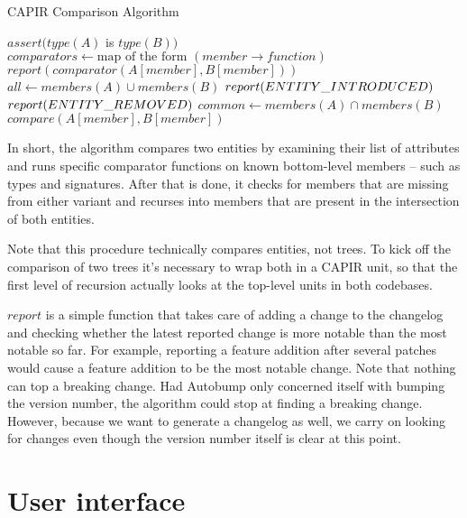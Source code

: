 \documentclass{l4proj}
\begin{document}
\begin{algorithm}
\caption{CAPIR Comparison Algorithm}
\begin{algorithmic}[1]
\State $assert(type(A)$ is $type(B))$
\State $comparators \gets \text{map of the form }(member \rightarrow function)$
$report(comparator(A[member], B[member]))$
\EndIf
\EndFor
\State $all \gets members(A) \cup members(B)$
$report(\detokenize{ENTITY_INTRODUCED})$
\EndIf
{}
$report(\detokenize{ENTITY_REMOVED})$
\EndIf
\EndFor
\State $common \gets members(A) \cap members(B)$
$compare(A[member], B[member])$
\EndFor
\EndProcedure
\end{algorithmic}
\end{algorithm}

In short, the algorithm compares two entities by examining their list
of attributes and runs specific comparator functions on known
bottom-level members -- such as types and signatures. After that is
done, it checks for members that are missing from either variant and
recurses into members that are present in the intersection of both entities.

Note that this procedure technically compares entities, not trees. To
kick off the comparison of two trees it's necessary to wrap both in a
CAPIR unit, so that the first level of recursion actually looks at the
top-level units in both codebases.

$report$ is a simple function that takes care of adding a change to
the changelog and checking whether the latest reported change is more
notable than the most notable so far. For example, reporting a feature
addition after several patches would cause a feature addition to be
the most notable change. Note that nothing can top a breaking change.
Had Autobump only concerned itself with bumping the version number,
the algorithm could stop at finding a breaking change. However,
because we want to generate a changelog as well, we carry on looking
for changes even though the version number itself is clear at this point.

\section{User interface}
\end{document}

